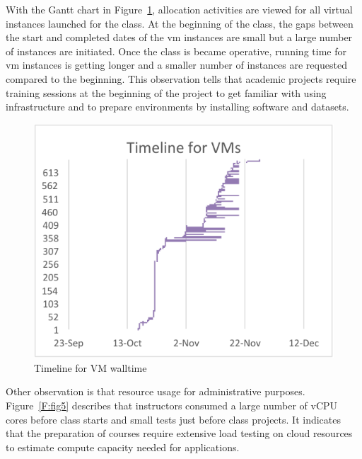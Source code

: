 \documentclass{sig-alternate}
\begin{document}
With the Gantt chart in Figure~\ref{F:fig4}, allocation activities are viewed for all virtual instances launched for the class. At the beginning of the class, the gaps between the start and completed dates of the vm instances are small but a large number of instances are initiated. Once the class is became operative,  running time for vm instances is getting longer and a smaller number of instances are requested compared to the beginning. This observation tells that academic projects require training sessions at the beginning of the project to get familiar with using infrastructure and to prepare environments by installing software and datasets.

\begin{figure}[h!] 
  \centering 
    \includegraphics[width=1.0\columnwidth]{images/fig3.pdf} 
  \caption{Timeline for VM walltime}\label{F:fig4} 
\end{figure} 

Other observation is that resource usage for administrative purposes. Figure~\ref{F:fig5} describes that instructors consumed a large number of vCPU cores before class starts and small tests just before class projects. It indicates that the preparation of courses require extensive load testing on cloud resources to estimate compute capacity needed for applications.
\end{document}
